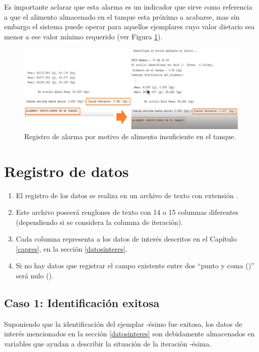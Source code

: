 Es importante aclarar que esta alarma es un indicador que sirve como referencia a que el alimento almacenado en el tanque esta próximo a acabarse, mas sin embargo el sistema puede operar para aquellos ejemplares cuyo valor dietario sea menor a ese valor mínimo requerido (ver Figura \ref{tankalpng}).

\begin{figure}[H]
    \centering
    \includegraphics[scale=0.5]{img/tankal.png}
    \caption{Registro de alarma por motivo de alimento insuficiente en el tanque.}
    \label{tankalpng}
\end{figure}
\pagebreak

\section{Registro de datos}

\begin{enumerate}
    \item El registro de los datos se realiza en un archivo de texto con extensión .
    \item Este archivo poseerá renglones de texto con 14 o 15 columnas diferentes (dependiendo si se considera la columna de iteración).
    \item Cada columna representa a los datos de interés descritos en el Capítulo \ref{capres}, en la sección \ref{datosinteres}.
    \item Si no hay datos que registrar el campo existente entre dos ``punto y coma (\textt{;})'' será nulo (\textt{\ldots;;\ldots}).
\end{enumerate}

\subsection{Caso 1: Identificación exitosa}

Suponiendo que la identificación del ejemplar -ésimo fue exitosa, los datos de interés mencionados en la sección \ref{datosinteres} son debidamente almacenados en variables que ayudan a describir la situación de la iteración -ésima.


